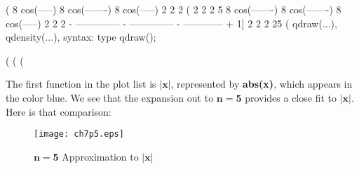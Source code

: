 \documentclass[12pt]{article}
\begin{document}
\begin{myVerbatim}
(%
           8 cos(-----)    8 cos(-------)   8 cos(-----)
                   2                2               2
(%
                  2                 2              2
                                  5 %
                            8 cos(-------)   8 cos(-------)   8 cos(-----)
                                     2                2               2
                          - -------------- - -------------- - ------------ + 1]
                                     2                2              2
                               25 %
(%
               qdraw(...), qdensity(...), syntax: type qdraw(); 

(%
(%
(%
\end{myVerbatim}
The first function in the plot list is $\mathbf{\vert x \vert}$, represented by
  \textbf{abs(x)}, which appears in the color blue.
We see that the expansion out to $\mathbf{n = 5}$ provides a close fit to $\mathbf{\vert x \vert}$.
Here is that comparison:
\begin{figure} [h]
   \centerline{\texttt{[image: ch7p5.eps]} }
	\caption{$\mathbf{n = 5}$ Approximation to $\mathbf{\vert x \vert}$  }
\end{figure}   
\end{document}
